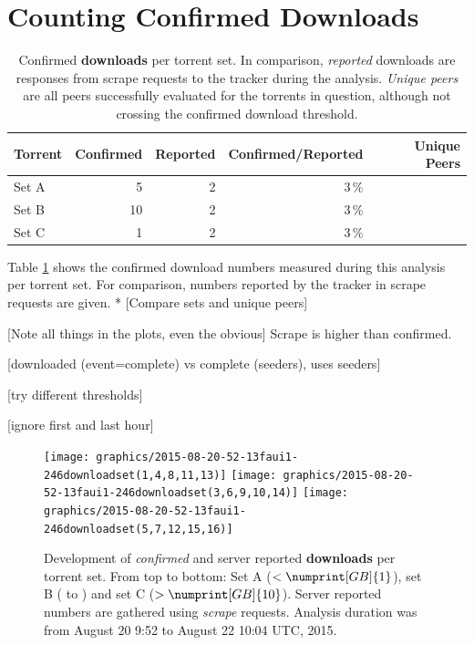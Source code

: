 \documentclass[10pt, a4paper, twoside, headsepline]{scrbook}
\renewcommand{\_}{\origunderscore\allowbreak}
\newcommand{\range}{from August 20 9:52 to August 22 10:04 UTC, 2015} %
\begin{document}
\section{Counting Confirmed Downloads}
\begin{table}
\centering
\begin{tabular}{lrrrr}
\toprule
Torrent & Confirmed & Reported & Confirmed/Reported & Unique Peers \\
\midrule
Set A & 5 & 2 & 3\,\% \\
Set B & 10 & 2 & 3\,\% \\
Set C & 1 & 2 & 3\,\% \\
\bottomrule
\end{tabular}
\caption[Confirmed downloads per torrent set]{Confirmed \textbf{downloads} per torrent set. In comparison, \emph{reported} downloads are responses from scrape requests to the tracker during the analysis. \emph{Unique peers} are all peers successfully evaluated for the torrents in question, although not crossing the confirmed download threshold.}
\label{confirmed-downloads}
\end{table}

Table \ref{confirmed-downloads} shows the confirmed download numbers measured during this analysis per torrent set. For comparison, numbers reported by the tracker in scrape requests are given. * [Compare sets and unique peers]

[Note all things in the plots, even the obvious] Scrape is higher than confirmed.

[downloaded (event=complete) vs complete (seeders), \cite{watters2011much} uses seeders]

[try different thresholds]

[ignore first and last hour]

\begin{figure}
\centering
\texttt{[image: graphics/2015-08-20\_11-52-13\_faui1-246\_download\_set\_(1,4,8,11,13)]}
\texttt{[image: graphics/2015-08-20\_11-52-13\_faui1-246\_download\_set\_(3,6,9,10,14)]}
\texttt{[image: graphics/2015-08-20\_11-52-13\_faui1-246\_download\_set\_(5,7,12,15,16)]}
\caption[Development of confirmed and reported downloads per torrent set]{Development of \emph{confirmed} and server reported \textbf{downloads} per torrent set. From top to bottom: Set A ($<\numprint[GB]{1}$), set B ( to ) and set C ($>\numprint[GB]{10}$). Server reported numbers are gathered using \emph{scrape} requests. Analysis duration was \range.}
\label{download-history}
\end{figure}
\end{document}
